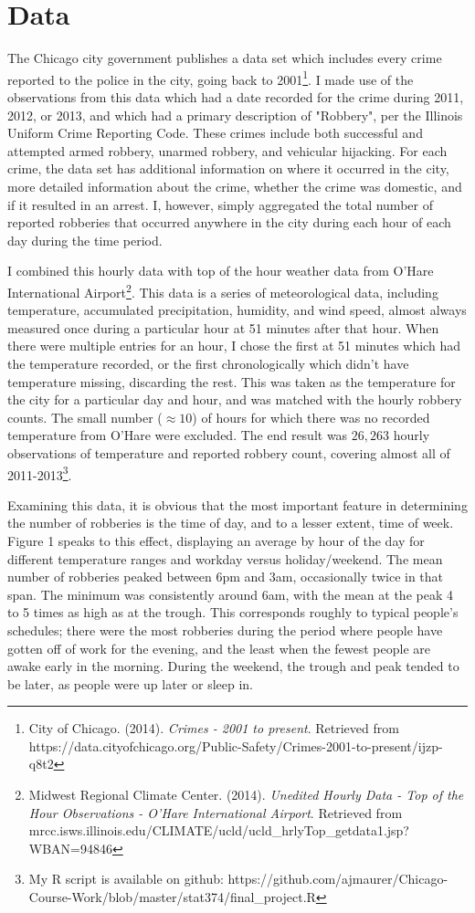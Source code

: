 \documentclass[11pt]{article}
\theoremstyle{definition}
\begin{document}
\section{Data} 
The Chicago city government publishes a data set which includes every crime reported to the police in the city, going back to 2001\footnote{City of Chicago. (2014). \textit{ Crimes - 2001 to present}. Retrieved from https://data.cityofchicago.org/Public-Safety/Crimes-2001-to-present/ijzp-q8t2}. I made use of the observations from this data which had a date recorded for the crime during 2011, 2012, or 2013, and which had a primary description of "Robbery", per the Illinois Uniform Crime Reporting Code. These crimes include both successful and attempted armed robbery, unarmed robbery, and vehicular hijacking. For each crime, the data set has additional information on where it occurred in the city, more detailed information about the crime, whether the crime was domestic, and if it resulted in an arrest. I, however, simply aggregated the total number of reported robberies that occurred anywhere in the city during each hour of each day during the time period. \par
I combined this hourly data with top of the hour weather data from O'Hare International Airport\footnote{Midwest Regional Climate Center. (2014). \textit{Unedited Hourly Data - Top of the Hour Observations - O'Hare International Airport}. Retrieved from mrcc.isws.illinois.edu/CLIMATE/ucld/ucld\_hrlyTop\_getdata1.jsp?WBAN=94846}. This data is a series of meteorological data, including temperature, accumulated precipitation, humidity, and wind speed, almost always measured once during a particular hour at 51 minutes after that hour. When there were multiple entries for an hour, I chose the first at 51 minutes which had the temperature recorded, or the first chronologically which didn't have temperature missing, discarding the rest. This was taken as the temperature for the city for a particular day and hour, and was matched with the hourly robbery counts. The small number ($\approx 10$) of hours for which there was no recorded temperature from O'Hare were excluded. The end result was $26,263$ hourly observations of temperature and reported robbery count, covering almost all of 2011-2013\footnote{My R script is available on github: https://github.com/ajmaurer/Chicago-Course-Work/blob/master/stat374/final\_project.R}. \par
Examining this data, it is obvious that the most important feature in determining the number of robberies is the time of day, and to a lesser extent, time of week. Figure 1 speaks to this effect, displaying an average by hour of the day for different temperature ranges and workday versus holiday/weekend. The mean number of robberies peaked between 6pm and 3am, occasionally twice in that span. The minimum was consistently around 6am, with the mean at the peak 4 to 5 times as high as at the trough. This corresponds roughly to typical people's schedules; there were the most robberies during the period where people have gotten off of work for the evening, and the least when the fewest people are awake early in the morning. During the weekend, the trough and peak tended to be later, as people were up later or sleep in. \par
\end{document}
